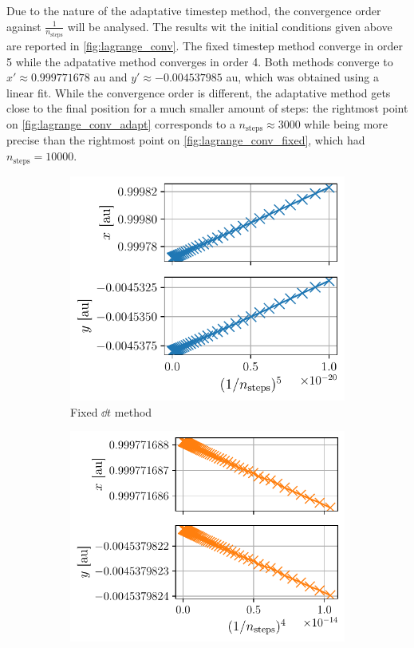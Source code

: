 Due to the nature of the adaptative timestep method, the convergence order against \(\frac{1}{n_\textrm{steps}}\) will be analysed. The results wit the initial conditions given above are reported in \autoref{fig:lagrange_conv}. The fixed timestep method converge in order 5 while the adpatative method converges in order 4. Both methods converge to \(x' \approx 0.999771678\) au and \(y' \approx -0.004537985\) au, which was obtained using a linear fit. While the convergence order is different, the adaptative method gets close to the final position for a much smaller amount of steps: the rightmost point on \autoref{fig:lagrange_conv_adapt} corresponds to a \(n_\textrm{steps} \approx 3000\) while being more precise than the rightmost point on \autoref{fig:lagrange_conv_fixed}, which had \(n_\textrm{steps} = 10000\).
\begin{figure}[h]
    \centering
    \begin{subfigure}{0.45\linewidth}
        \centering
        \includegraphics[width=\linewidth]{figures/lagrange_convergence_fixed.pdf}
        \caption{Fixed \(\dd t\) method}
        \label{fig:lagrange_conv_fixed}
    \end{subfigure}
    \begin{subfigure}{0.49\linewidth}
        \centering
        \includegraphics[width=\linewidth]{figures/lagrange_convergence_adapt.pdf}

\end{subfigure}
\end{figure}
